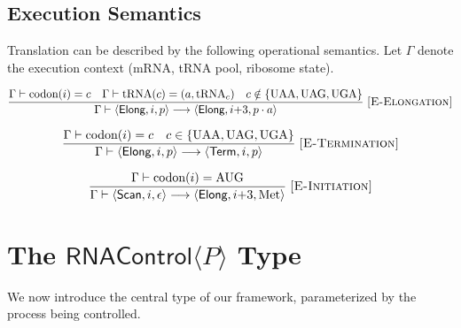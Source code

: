 \documentclass[12pt,a4paper]{article}
\theoremstyle{definition}
\newcommand{\RNAType}{\mathsf{RNAControl}}
\begin{document}
\subsection{Execution Semantics}

Translation can be described by the following operational semantics.
Let $\Gamma$ denote the execution context (mRNA, tRNA pool, ribosome
state).

\[
\frac{
  \Gamma \vdash \text{codon}(i) = c \quad
  \Gamma \vdash \text{tRNA}(c) = (a, \text{tRNA}_c) \quad
  c \notin \{\text{UAA}, \text{UAG}, \text{UGA}\}
}{
  \Gamma \vdash \langle \textsf{Elong}, i, p \rangle
    \longrightarrow \langle \textsf{Elong}, i{+}3, p \cdot a \rangle
}
\;\textsc{[E-Elongation]}
\]

\[
\frac{
  \Gamma \vdash \text{codon}(i) = c \quad
  c \in \{\text{UAA}, \text{UAG}, \text{UGA}\}
}{
  \Gamma \vdash \langle \textsf{Elong}, i, p \rangle
    \longrightarrow \langle \textsf{Term}, i, p \rangle
}
\;\textsc{[E-Termination]}
\]

\[
\frac{
  \Gamma \vdash \text{codon}(i) = \text{AUG}
}{
  \Gamma \vdash \langle \textsf{Scan}, i, \epsilon \rangle
    \longrightarrow \langle \textsf{Elong}, i{+}3, \text{Met} \rangle
}
\;\textsc{[E-Initiation]}
\]

\section{The \texorpdfstring{$\RNAType\langle P\rangle$}{RNAControl<P>} Type}\label{sec:rnacontrol}

We now introduce the central type of our framework, parameterized by
the process being controlled.
\end{document}
